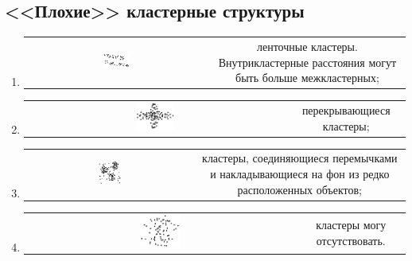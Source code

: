 \subsection{<<Плохие>> кластерные структуры}
	\begin{enumerate}
		\item
		\begin{tabular}{c c}
			\parbox{0.15\textwidth}{\includegraphics[width=0.15\textwidth]{img/lent.pdf}} & \parbox{0.7\textwidth}{ленточные кластеры. Внутрикластерные расстояния могут быть больше межкластерных;}
		\end{tabular}
		\vspace{0.5cm}
		\item
		\begin{tabular}{c c}
			\parbox{0.15\textwidth}{\includegraphics[width=0.15\textwidth]{img/perek.pdf}} & \parbox{0.7\textwidth}{перекрывающиеся кластеры;}
		\end{tabular}
		\vspace{0.5cm}
		\item
		\begin{tabular}{c c}
			\parbox{0.15\textwidth}{\includegraphics[width=0.15\textwidth]{img/fon.pdf}} & \parbox{0.7\textwidth}{кластеры, соединяющиеся перемычками и накладывающиеся на фон из редко расположенных объектов;}
		\end{tabular}
		\vspace{0.5cm}
		\item
		\begin{tabular}{c c}
			\parbox{0.15\textwidth}{\includegraphics[width=0.15\textwidth]{img/ots.pdf}} & \parbox{0.7\textwidth}{кластеры могу отсутствовать.}
		\end{tabular}
	\end{enumerate}

